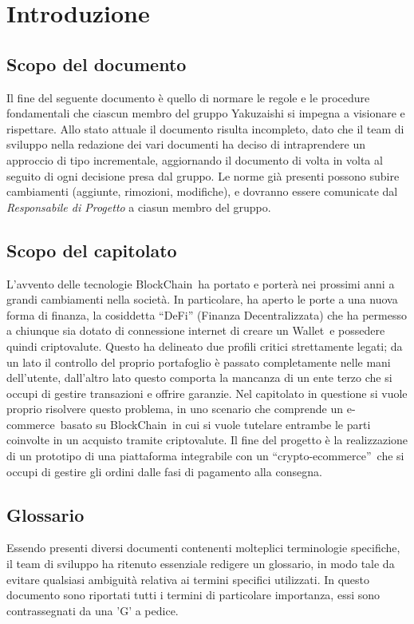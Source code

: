 \section{Introduzione} \label{section: introduzione}

\subsection {Scopo del documento}
Il fine del seguente documento è quello di normare le regole e le procedure fondamentali che ciascun membro del gruppo Yakuzaishi si impegna a visionare e rispettare.
Allo stato attuale il documento risulta incompleto, dato che il team di sviluppo nella redazione dei vari documenti ha deciso di intraprendere un approccio di tipo incrementale, aggiornando il documento di volta in volta al seguito di ogni decisione presa dal gruppo.
Le norme già presenti possono subire cambiamenti (aggiunte, rimozioni, modifiche), e dovranno essere comunicate dal \textit{Responsabile di Progetto} a ciasun membro del gruppo.

\subsection{Scopo del capitolato}
L'avvento delle tecnologie BlockChain\glo\ ha portato e porterà nei prossimi anni a grandi cambiamenti nella società. 
In particolare, ha aperto le porte a una nuova forma di finanza, la cosiddetta “DeFi” (Finanza Decentralizzata) che ha permesso a chiunque sia dotato di connessione internet di creare un Wallet\glo\ e possedere quindi criptovalute\glo.
Questo ha delineato due profili critici strettamente legati; da un lato il controllo del proprio portafoglio è passato completamente nelle mani dell'utente, dall'altro lato questo comporta la mancanza di un ente terzo che si occupi di gestire transazioni e offrire garanzie.
\newline
Nel capitolato in questione si vuole proprio risolvere questo problema, in uno scenario che comprende un e-commerce\glo\ basato su BlockChain\glo\ in cui si vuole tutelare entrambe le parti coinvolte in un acquisto tramite criptovalute.
\newline
Il fine del progetto è la realizzazione di un prototipo di una piattaforma integrabile con un “crypto-ecommerce”\glo\, che si occupi di gestire gli ordini dalle fasi di pagamento alla consegna.

\subsection{Glossario}
Essendo presenti diversi documenti contenenti molteplici terminologie specifiche, il team di sviluppo ha ritenuto essenziale redigere un glossario, in modo tale da evitare qualsiasi ambiguità relativa ai termini specifici utilizzati. 
In questo documento sono riportati tutti i termini di particolare importanza, essi sono contrassegnati da una 'G' a pedice.


